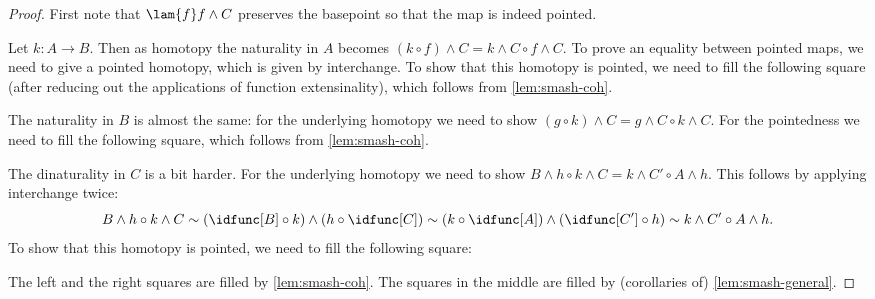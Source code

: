 \documentclass{article}
\newcommand{\pmap}{\to}
\newcommand{\smsh}{\wedge}
\renewcommand{\o}{\ensuremath{\circ}}
\begin{document}
\begin{proof}
First note that $\lam{f}f\smsh C$ preserves the basepoint so that the map is indeed pointed.

Let $k:A\pmap B$. Then as homotopy the naturality in $A$ becomes
$(k\o f)\smsh C=k\smsh C\o f\smsh C$. To prove an equality between pointed maps, we need to give
a pointed homotopy, which is given by interchange. To show that this homotopy is pointed, we need to
fill the following square (after reducing out the applications of function extensinality), which follows from \autoref{lem:smash-coh}.
\begin{center}
\end{center}
The naturality in $B$ is almost the same: for the underlying homotopy we need to show
$(g \o k)\smsh C = g\smsh C \o k\smsh C$. For the pointedness we need to fill the following
square, which follows from \autoref{lem:smash-coh}.
\begin{center}
\end{center}
The dinaturality in $C$ is a bit harder. For the underlying homotopy we need to show
$B\smsh h\o k\smsh C=k\smsh C'\o A\smsh h$. This follows by applying interchange twice:
$$B\smsh h\o k\smsh C\sim(\idfunc[B]\o k)\smsh(h\o\idfunc[C])\sim(k\o\idfunc[A])\smsh(\idfunc[C']\o h)\sim k\smsh C'\o A\smsh h.$$
To show that this homotopy is pointed, we need to fill the following square:
\begin{center}
\end{center}
The left and the right squares are filled by \autoref{lem:smash-coh}. The squares in the middle
are filled by (corollaries of) \autoref{lem:smash-general}.
\end{proof}
\end{document}

